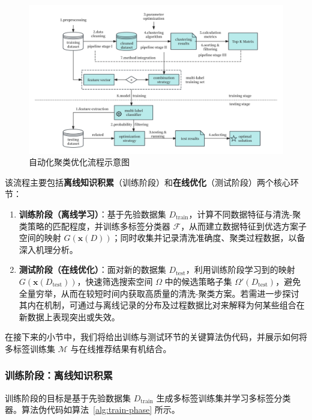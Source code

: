 \documentclass[10pt]{article} %
\numberwithin{equation}{section}
\begin{document}
\begin{figure}[t]
  \centering
  \includegraphics[width=0.9\linewidth]{figures/4graph/autocluster_workflow.pdf}
  \caption{自动化聚类优化流程示意图}
  \label{fig:autocluster-workflow}
\end{figure}

该流程主要包括\textbf{离线知识积累}（训练阶段）和\textbf{在线优化}（测试阶段）两个核心环节：
\begin{enumerate}
    \item \textbf{训练阶段（离线学习）}：基于先验数据集 $D_{\text{train}}$，计算不同数据特征与清洗-聚类策略的匹配程度，并训练多标签分类器 $\mathcal{F}$，从而建立数据特征到优选方案子空间的映射 $G(\mathbf{x}(D))$；同时收集并记录清洗准确度、聚类过程数据，以备深入机理分析。
    \item \textbf{测试阶段（在线优化）}：面对新的数据集 $D_{\text{test}}$，利用训练阶段学习到的映射 $G(\mathbf{x}(D_{\text{test}}))$，快速筛选搜索空间 $\Omega$ 中的候选策略子集 $\Omega'(D_{\text{test}})$，避免全量穷举，从而在较短时间内获取高质量的清洗-聚类方案。若需进一步探讨其内在机制，可通过与离线记录的分布及过程数据比对来解释为何某些组合在新数据上表现突出或失效。
\end{enumerate}

在接下来的小节中，我们将给出训练与测试环节的关键算法伪代码，并展示如何将多标签训练集 $\mathcal{M}$ 与在线推荐结果有机结合。

\subsubsection{训练阶段：离线知识积累}
训练阶段的目标是基于先验数据集 \(D_{\text{train}}\) 生成多标签训练集并学习多标签分类器。算法伪代码如算法~\ref{alg:train-phase} 所示。
\end{document}
